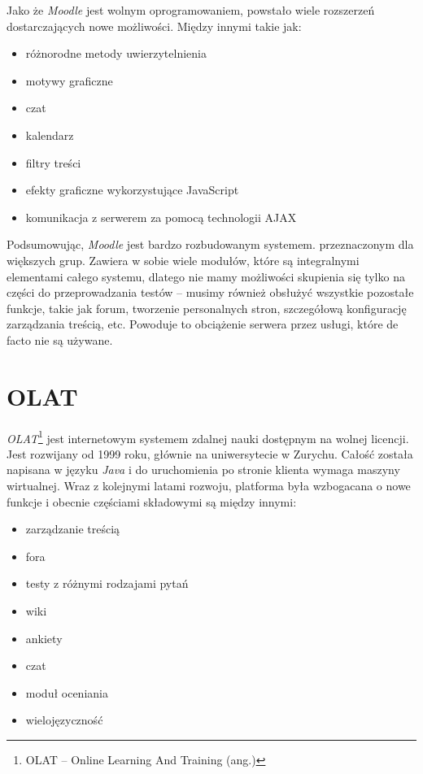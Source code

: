 \documentclass[12pt,twoside]{report}
\begin{document}
Jako że \emph{Moodle} jest wolnym oprogramowaniem, powstało wiele rozszerzeń
dostarczających nowe możliwości. Między innymi takie jak:

\begin{itemize}
  \item{różnorodne metody uwierzytelnienia}
  \item{motywy graficzne}
  \item{czat}
  \item{kalendarz}
  \item{filtry treści}
  \item{efekty graficzne wykorzystujące JavaScript}
  \item{komunikacja z serwerem za pomocą technologii AJAX}
\end{itemize}


Podsumowując, \emph{Moodle} jest bardzo rozbudowanym systemem. przeznaczonym dla większych
grup. Zawiera w sobie wiele modułów, które są integralnymi elementami całego systemu, dlatego
nie mamy możliwości skupienia się tylko na części do przeprowadzania testów -- musimy
również obsłużyć wszystkie pozostałe funkcje, takie jak forum, tworzenie personalnych
stron, szczegółową konfigurację zarządzania treścią, etc. Powoduje to obciążenie
serwera przez usługi, które de facto nie są używane.

\section{OLAT}
\emph{OLAT}\footnote{OLAT -- Online Learning And Training (ang.)} jest internetowym
systemem zdalnej nauki dostępnym na wolnej licencji. Jest rozwijany od 1999 roku, głównie
na uniwersytecie w Zurychu. Całość została napisana w języku \emph{Java} i do uruchomienia
po stronie klienta wymaga maszyny wirtualnej. Wraz z kolejnymi latami rozwoju, platforma
była wzbogacana o nowe funkcje i obecnie częściami składowymi są między innymi:

\begin{itemize}
  \item{zarządzanie treścią}
  \item{fora}
  \item{testy z różnymi rodzajami pytań}
  \item{wiki}
  \item{ankiety}
  \item{czat}
  \item{moduł oceniania}
  \item{wielojęzyczność}
\end{itemize}
\end{document}
